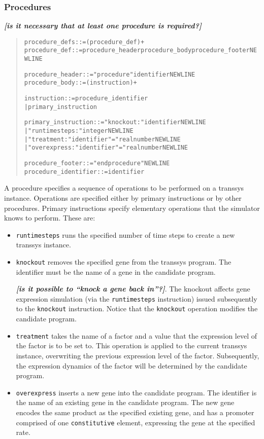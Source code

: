 \documentclass[a4paper,fleqn]{article}
\newcommand{\computercode}[1]{\texttt{#1}}
\newcommand{\todo}[1]{\rule{0pt}{0pt}\marginpar{\rule{1ex}{1ex}}\textbf{\emph{[#1]}}}
\newenvironment{ebnfrule}{\begin{footnotesize}\begin{quote}\begin{alltt}}{\end{alltt}\end{quote}\end{footnotesize}}
\begin{document}
\subsubsection{Procedures}
\label{section_procedures}

\todo{is it necessary that at least one procedure is required?}

\begin{ebnfrule}
procedure_defs ::= (procedure_def)+
procedure_def ::= procedure_header procedure_body procedure_footer NEWLINE

procedure_header ::= "procedure" identifier NEWLINE 
procedure_body ::= (instruction)+

instruction ::= procedure_identifier
	| primary_instruction

primary_instruction ::= "knockout:" identifier NEWLINE
	| "runtimesteps:" integer NEWLINE
	| "treatment:" identifier "=" realnumber NEWLINE
	| "overexpress:" identifier "=" realnumber NEWLINE 

procedure_footer ::= "endprocedure" NEWLINE
procedure_identifier ::= identifier
\end{ebnfrule}
A procedure specifies a sequence of operations to be performed on a
transsys instance. Operations are specified either by primary
instructions or by other procedures. Primary instructions specify
elementary operations that the simulator knows to perform. These are:
\begin{itemize}
\item \computercode{runtimesteps} runs the specified number of time
  steps to create a new transsys instance.
\item \computercode{knockout} removes the specified gene from the
  transsys program. The identifier must be the name of a gene in the
  candidate program. \todo{is it possible to ``knock a gene back
    in''?}. The knockout affects gene expression simulation (via the
  \computercode{runtimesteps} instruction) issued subsequently to the
  \computercode{knockout} instruction. Notice that the
  \computercode{knockout} operation modifies the candidate program.
\item \computercode{treatment} takes the name of a factor and a value
  that the expression level of the factor is to be set to. This
  operation is applied to the current transsys instance, overwriting
  the previous expression level of the factor. Subsequently, the
  expression dynamics of the factor will be determined by the
  candidate program.
\item \computercode{overexpress} inserts a new gene into the candidate
  program. The identifier is the name of an existing gene in the
  candidate program. The new gene encodes the same product as the
  specified existing gene, and has a promoter comprised of one
  \computercode{constitutive} element, expressing the gene at the
  specified rate.
\end{itemize}
\end{document}
